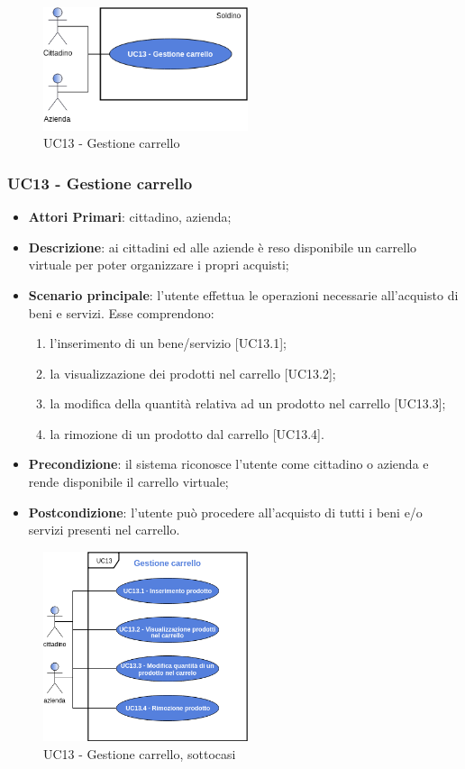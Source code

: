  \begin{figure}[H]
	\includegraphics[width=6cm]{res/images/UC13.png}
	\centering
	\caption{UC13 - Gestione carrello}
\end{figure}
\subsubsection{UC13 - Gestione carrello}

\begin{itemize}
	\item \textbf{Attori Primari}: cittadino, azienda;
	\item \textbf{Descrizione}: ai cittadini ed alle aziende è reso disponibile un carrello virtuale per poter organizzare i propri acquisti;
	\item \textbf{Scenario principale}: l'utente effettua le operazioni necessarie all'acquisto di beni e servizi. Esse comprendono:
	\begin{enumerate}[label=\alph*.]
		\item l'inserimento di un bene/servizio [UC13.1];
		\item la visualizzazione dei prodotti nel carrello [UC13.2];
		\item la modifica della quantità relativa ad un prodotto nel carrello [UC13.3];
		\item la rimozione di un prodotto dal carrello [UC13.4].
	\end{enumerate}
	\item \textbf{Precondizione}: il sistema riconosce l'utente come cittadino o azienda e rende disponibile il carrello virtuale;
	\item \textbf{Postcondizione}: l'utente può procedere all'acquisto di tutti i beni e/o servizi presenti nel carrello.
\end{itemize} 
 \begin{figure}[h]
	\includegraphics[width=6cm]{res/images/UC13GestioneCarrello.png}
	\centering
	\caption{UC13 - Gestione carrello, sottocasi}
\end{figure}
